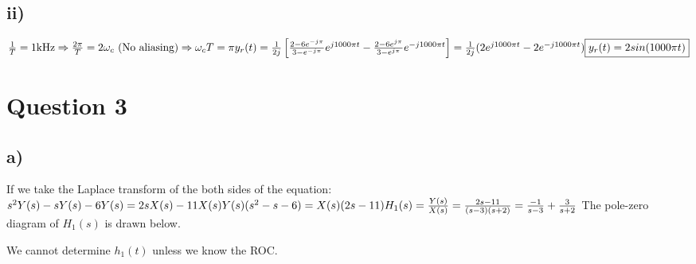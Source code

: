 \documentclass[12pt]{article}
\begin{document}
    \subsection*{ii)}
    \begin{math}
    \frac{1}{T} = 1 \textrm{kHz} \Rightarrow  \frac{2\pi}{T} = 2\omega_c \ \textrm{(No aliasing)} \Rightarrow \omega_c T = \pi \\
    y_r(t) = \frac{1}{2j} \left[ \frac{2-6e^{-j\pi}}{3-e^{-j\pi}} e^{j1000\pi t} - \frac{2-6e^{j\pi}}{3-e^{j\pi}} e^{-j1000\pi t} \right] = \frac{1}{2j} (2e^{j1000\pi t} - 2e^{-j1000\pi t}) \\
    \boxed{y_r(t) = 2sin(1000\pi t)}
    \end{math} 
    \section*{Question 3}
    \subsection*{a)}
    If we take the Laplace transform of the both sides of the equation: \\
    \begin{math}
        s^2Y(s) - sY(s) -6Y(s) = 2sX(s) -11X(s) \\
        Y(s)(s^2-s-6) = X(s)(2s-11) \\ 
        H_1(s) = \frac{Y(s)}{X(s)} = \frac{2s-11}{(s-3)(s+2)} = \frac{-1}{s-3} + \frac{3}{s+2}\\ \\
    \end{math}
    The pole-zero diagram of \(H_1(s)\) is drawn below.
    \begin{center}
	\end{center}
    We cannot determine \(h_1(t)\) unless we know the ROC.
\end{document}
